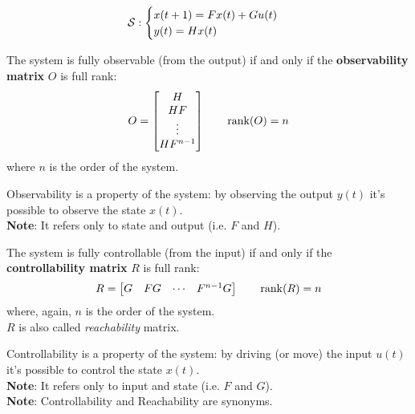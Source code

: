 \[
    \mathcal{S}: 
    \begin{cases}
        x(t+1) = Fx(t) + Gu(t) \\
        y(t) = Hx(t)
    \end{cases}
\]

\begin{definition}
The system is fully observable (from the output) if and only if the \textbf{observability matrix} $O$ is full rank:
\[
    O = \begin{bmatrix}
        H \\
        HF \\
        \vdots \\
        HF^{n-1}
    \end{bmatrix}
    \qquad
    \operatorname*{rank} (O) = n
\]
where $n$ is the order of the system.
\end{definition}

\begin{obs}[Observability]
Observability is a property of the system: by observing the output $y(t)$ it's possible to observe the state $x(t)$.\\
\textbf{Note}: It refers only to state and output (i.e. $F$ and $H$).
\end{obs}

\begin{definition}
The system is fully controllable (from the input) if and only if the \textbf{controllability matrix} $R$ is full rank:
\[
    R = \begin{bmatrix}
        G & FG & \cdots & F^{n-1}G
    \end{bmatrix}
    \qquad
    \operatorname*{rank} (R) = n
\]
where, again, $n$ is the order of the system.\\
$R$ is also called \emph{reachability} matrix.
\end{definition}

\begin{obs}[Controllability]
Controllability is a property of the system: by driving (or move) the input $u(t)$ it's possible to control the state $x(t)$.\\
\textbf{Note}: It refers only to input and state (i.e. $F$ and $G$).\\
\textbf{Note}: Controllability and Reachability are synonyms.
\end{obs}

